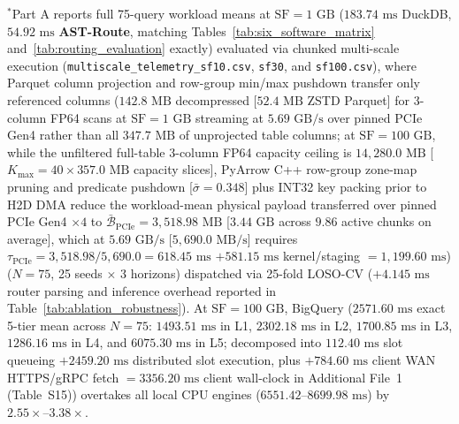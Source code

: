 \documentclass[10pt,a4paper]{article}
\newenvironment{fitasttable}{%
  \begin{lrbox}{\asttblbox}%
}{%
  \end{lrbox}%
  \sbox{\asttblboxB}{%
    \ifdim\wd\asttblbox>0.96\textwidth
      \resizebox{0.96\textwidth}{!}{\usebox{\asttblbox}}%
    \else
      \usebox{\asttblbox}%
    \fi
  }%
  \ifdim\ht\asttblboxB>0.72\textheight
    \resizebox{!}{0.72\textheight}{\usebox{\asttblboxB}}%
  \else
    \usebox{\asttblboxB}%
  \fi
}
\begin{document}
\begin{table}[!htbp]
\begin{fitasttable}
\begin{tabular}{@{}llcccccccl@{}}
\bottomrule
\end{tabular}
\end{fitasttable}%
\vspace{2pt}
\parbox{0.96\textwidth}{\scriptsize $^{*}$Part A reports full 75-query workload means at $\text{SF}=1\text{ GB}$ ($183.74\text{ ms}$ DuckDB, $54.92\text{ ms}$ \textbf{AST-Route}, matching Tables~\ref{tab:six_software_matrix} and~\ref{tab:routing_evaluation} exactly) evaluated via chunked multi-scale execution (\texttt{multiscale\_\allowbreak{}telemetry\_\allowbreak{}sf10.csv}, \texttt{sf30}, and \texttt{sf100.csv}), where Parquet column projection and row-group min/max pushdown transfer only referenced columns ($142.8\text{ MB}$ decompressed [$52.4\text{ MB}$ ZSTD Parquet] for 3-column FP64 scans at $\text{SF}=1\text{ GB}$ streaming at $5.69\text{ GB/s}$ over pinned PCIe Gen4 rather than all $347.7\text{ MB}$ of unprojected table columns; at $\text{SF}=100\text{ GB}$, while the unfiltered full-table 3-column FP64 capacity ceiling is $14{,}280.0\text{ MB}$ [$K_{\max}=40 \times 357.0\text{ MB}$ capacity slices], PyArrow C++ row-group zone-map pruning and predicate pushdown [$\bar{\sigma}=0.348$] plus INT32 key packing prior to H2D DMA reduce the workload-mean physical payload transferred over pinned PCIe Gen4 $\times 4$ to $\bar{\mathcal{B}}_{\text{PCIe}}=3{,}518.98\text{ MB}$ [$3.44\text{ GB}$ across $9.86$ active chunks on average], which at $5.69\text{ GB/s}$ [$5{,}690.0\text{ MB/s}$] requires $\tau_{\text{PCIe}} = 3{,}518.98 / 5{,}690.0 = 618.45\text{ ms}$ $+ 581.15\text{ ms}$ kernel/staging $= 1{,}199.60\text{ ms}$) ($N=75$, 25 seeds $\times$ 3 horizons) dispatched via 25-fold LOSO-CV ($+4.145\text{ ms}$ router parsing and inference overhead reported in Table~\ref{tab:ablation_robustness}). At $\text{SF}=100\text{ GB}$, BigQuery ($2571.60\text{ ms}$ exact 5-tier mean across $N=75$: $1493.51\text{ ms}$ in L1, $2302.18\text{ ms}$ in L2, $1700.85\text{ ms}$ in L3, $1286.16\text{ ms}$ in L4, and $6075.30\text{ ms}$ in L5; decomposed into $112.40\text{ ms}$ slot queueing $+ 2459.20\text{ ms}$ distributed slot execution, plus $+784.60\text{ ms}$ client WAN HTTPS/gRPC fetch $= 3356.20\text{ ms}$ client wall-clock in Additional File~1 (Table~S15)) overtakes all local CPU engines ($6551.42\text{--}8699.98\text{ ms}$) by $\mathbf{2.55\times\text{--}3.38\times}$.}
\end{table}
\end{document}
